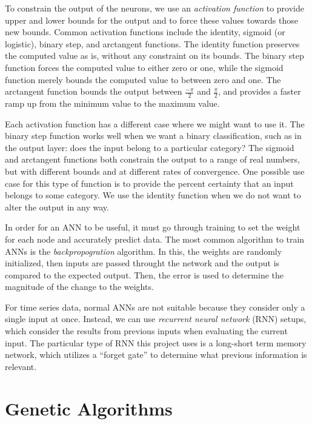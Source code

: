 To constrain the output of the neurons, we use an \textit{activation function} to provide upper and lower bounds for the output and to force these values towards those new bounds.
Common activation functions include the identity, sigmoid (or logistic), binary step, and arctangent functions.
The identity function preserves the computed value as is, without any constraint on its bounds.
The binary step function forces the computed value to either zero or one, while the sigmoid function merely bounds the computed value to between zero and one.
The arctangent function bounds the output between $\frac{-\pi}{2}$ and $\frac{\pi}{2}$, and provides a faster ramp up from the minimum value to the maximum value.

Each activation function has a different case where we might want to use it.
The binary step function works well when we want a binary classification, such as in the output layer: does the input belong to a particular category?
The sigmoid and arctangent functions both constrain the output to a range of real numbers, but with different bounds and at different rates of convergence.
One possible use case for this type of function is to provide the percent certainty that an input belongs to some category.
We use the identity function when we do not want to alter the output in any way.

In order for an ANN to be useful, it must go through training to set the weight for each node and accurately predict data.
The most common algorithm to train ANNs is the \textit{backpropogration} algorithm.
In this, the weights are randomly initialized, then inputs are passed throught the network and the output is compared to the expected output.
Then, the error is used to determine the magnitude of the change to the weights.

For time series data, normal ANNs are not suitable because they consider only a single input at once.
Instead, we can use \textit{recurrent neural network} (RNN) setups, which consider the results from previous inputs when evaluating the current input.
The particular type of RNN this project uses is a long-short term memory network, which utilizes a ``forget gate'' to determine what previous information is relevant.

\section{Genetic Algorithms} \label{bg:ga}

